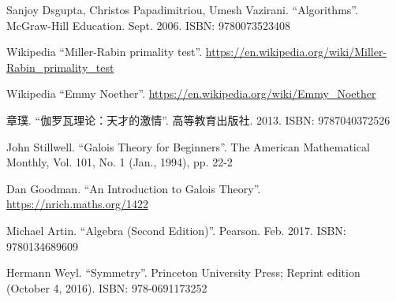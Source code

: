 \documentclass[b5paper]{article}
\begin{document}
\begin{thebibliography}{99}
Sanjoy Dsgupta, Christos Papadimitriou, Umesh Vazirani. ``Algorithms''. McGraw-Hill Education. Sept. 2006. ISBN: 9780073523408

Wikipedia ``Miller-Rabin primality test''. \url{https://en.wikipedia.org/wiki/Miller-Rabin_primality_test}

Wikipedia ``Emmy Noether''. \url{https://en.wikipedia.org/wiki/Emmy_Noether}

章璞. ``伽罗瓦理论：天才的激情''. 高等教育出版社. 2013. ISBN: 9787040372526

John Stillwell. ``Galois Theory for Beginners''. The American Mathematical Monthly, Vol. 101, No. 1 (Jan., 1994), pp. 22-2

Dan Goodman. ``An Introduction to Galois Theory''. \url{https://nrich.maths.org/1422}

Michael Artin. ``Algebra (Second Edition)''. Pearson. Feb. 2017. ISBN: 9780134689609

Hermann Weyl. ``Symmetry''. Princeton University Press; Reprint edition (October 4, 2016). ISBN: 978-0691173252

\end{thebibliography}

\expandafter\enddocument

\fi
\end{document}
